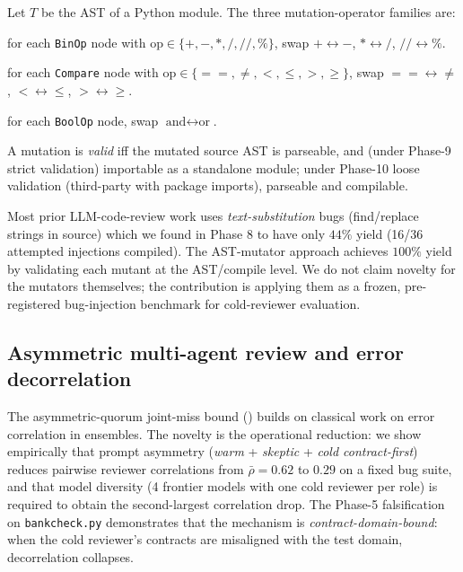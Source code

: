 \begin{definition}
\label{def:ast-mutators}
Let $T$ be the AST of a Python module. The three mutation-operator families are:
\begin{description}[leftmargin=1.5em]
\item[AOR (Arithmetic Operator Replacement)] for each \texttt{BinOp} node with $\mathrm{op} \in \{+, -, *, /, //, \%\}$, swap $+ \leftrightarrow -$, $* \leftrightarrow /$, $// \leftrightarrow \%$.
\item[ROR (Relational Operator Replacement)] for each \texttt{Compare} node with $\mathrm{op} \in \{==, \ne, <, \le, >, \ge\}$, swap $== \leftrightarrow \ne$, $< \leftrightarrow \le$, $> \leftrightarrow \ge$.
\item[BOR (Boolean Operator Replacement)] for each \texttt{BoolOp} node, swap $\text{and} \leftrightarrow \text{or}$.
\end{description}
A mutation is \emph{valid} iff the mutated source AST is parseable, and (under Phase-9 strict validation) importable as a standalone module; under Phase-10 loose validation (third-party with package imports), parseable and compilable.
\end{definition}

 Most prior LLM-code-review work uses \emph{text-substitution} bugs (find/replace strings in source) which we found in Phase 8 to have only $44\%$ yield (16/36 attempted injections compiled). The AST-mutator approach achieves $100\%$ yield by validating each mutant at the AST/compile level. We do not claim novelty for the mutators themselves; the contribution is applying them as a frozen, pre-registered bug-injection benchmark for cold-reviewer evaluation.

\subsection{Asymmetric multi-agent review and error decorrelation}

The asymmetric-quorum joint-miss bound () builds on classical work on error correlation in ensembles. The novelty is the operational reduction: we show empirically that prompt asymmetry (\emph{warm} + \emph{skeptic} + \emph{cold contract-first}) reduces pairwise reviewer correlations from $\bar{\rho} = 0.62$ to $0.29$ on a fixed bug suite, and that model diversity (4 frontier models with one cold reviewer per role) is required to obtain the second-largest correlation drop. The Phase-5 falsification on \texttt{bankcheck.py} demonstrates that the mechanism is \emph{contract-domain-bound}: when the cold reviewer's contracts are misaligned with the test domain, decorrelation collapses.

